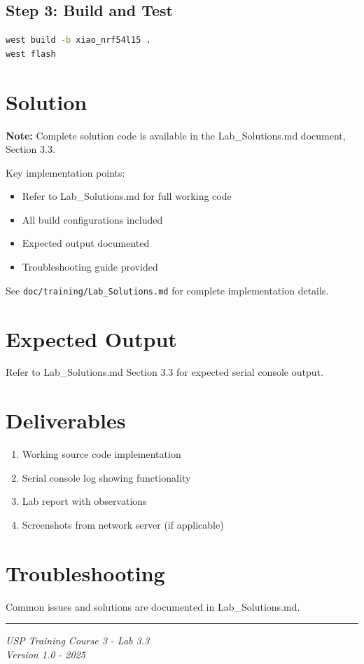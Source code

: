 \documentclass[11pt,a4paper]{article}
\begin{document}
\subsection{Step 3: Build and Test}
\begin{lstlisting}[language=bash]
west build -b xiao_nrf54l15 .
west flash
\end{lstlisting}

\section{Solution}

\begin{solutionbox}
\textbf{Note:} Complete solution code is available in the Lab\_Solutions.md document, Section 3.3.

Key implementation points:
\begin{itemize}
    \item Refer to Lab\_Solutions.md for full working code
    \item All build configurations included
    \item Expected output documented
    \item Troubleshooting guide provided
\end{itemize}

See \texttt{doc/training/Lab\_Solutions.md} for complete implementation details.
\end{solutionbox}

\section{Expected Output}

Refer to Lab\_Solutions.md Section 3.3 for expected serial console output.

\section{Deliverables}

\begin{enumerate}[itemsep=10pt]
    \item Working source code implementation
    \item Serial console log showing functionality
    \item Lab report with observations
    \item Screenshots from network server (if applicable)
\end{enumerate}

\section{Troubleshooting}

Common issues and solutions are documented in Lab\_Solutions.md.

\vfill
\noindent\rule{\textwidth}{0.4pt}
\begin{center}
\textit{USP Training Course 3 - Lab 3.3}\\
\textit{Version 1.0 - 2025}
\end{center}
\end{document}
